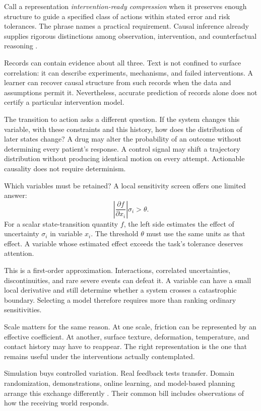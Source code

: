 Call a representation \emph{intervention-ready compression} when it preserves enough structure to guide a specified class of actions within stated error and risk tolerances. The phrase names a practical requirement. Causal inference already supplies rigorous distinctions among observation, intervention, and counterfactual reasoning \cite{pearl2009causality}.

Records can contain evidence about all three. Text is not confined to surface correlation: it can describe experiments, mechanisms, and failed interventions. A learner can recover causal structure from such records when the data and assumptions permit it. Nevertheless, accurate prediction of records alone does not certify a particular intervention model.

The transition to action asks a different question. If the system changes this variable, with these constraints and this history, how does the distribution of later states change? A drug may alter the probability of an outcome without determining every patient's response. A control signal may shift a trajectory distribution without producing identical motion on every attempt. Actionable causality does not require determinism.

Which variables must be retained? A local sensitivity screen offers one limited answer:
\begin{equation}
 \left|\frac{\partial f}{\partial x_i}\right|\sigma_i>\theta.
\end{equation}
For a scalar state-transition quantity $f$, the left side estimates the effect of uncertainty $\sigma_i$ in variable $x_i$. The threshold $\theta$ must use the same units as that effect. A variable whose estimated effect exceeds the task's tolerance deserves attention.

This is a first-order approximation. Interactions, correlated uncertainties, discontinuities, and rare severe events can defeat it. A variable can have a small local derivative and still determine whether a system crosses a catastrophic boundary. Selecting a model therefore requires more than ranking ordinary sensitivities.

Scale matters for the same reason. At one scale, friction can be represented by an effective coefficient. At another, surface texture, deformation, temperature, and contact history may have to reappear. The right representation is the one that remains useful under the interventions actually contemplated.

Simulation buys controlled variation. Real feedback tests transfer. Domain randomization, demonstrations, online learning, and model-based planning arrange this exchange differently \cite{tobin2017domain}. Their common bill includes observations of how the receiving world responds.

